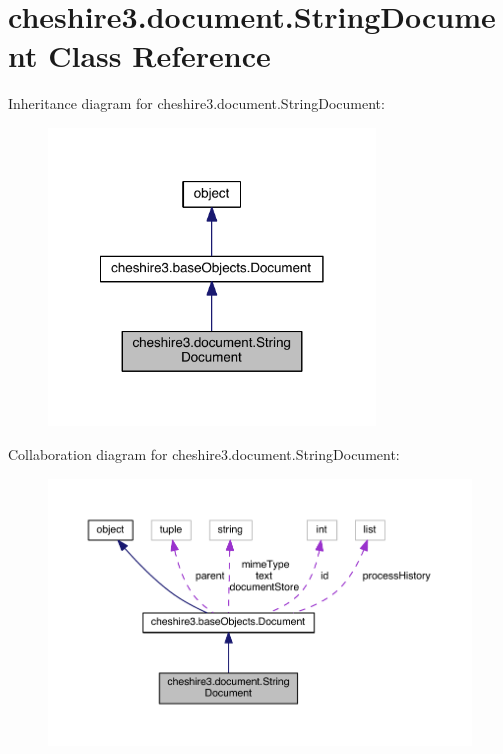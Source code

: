 \hypertarget{classcheshire3_1_1document_1_1_string_document}{\section{cheshire3.\-document.\-String\-Document Class Reference}
\label{classcheshire3_1_1document_1_1_string_document}
}


Inheritance diagram for cheshire3.\-document.\-String\-Document\-:
\nopagebreak
\begin{figure}[H]
\begin{center}
\leavevmode
\includegraphics[width=246pt]{classcheshire3_1_1document_1_1_string_document__inherit__graph}
\end{center}
\end{figure}


Collaboration diagram for cheshire3.\-document.\-String\-Document\-:
\nopagebreak
\begin{figure}[H]
\begin{center}
\leavevmode
\includegraphics[width=350pt]{classcheshire3_1_1document_1_1_string_document__coll__graph}
\end{center}
\end{figure}
